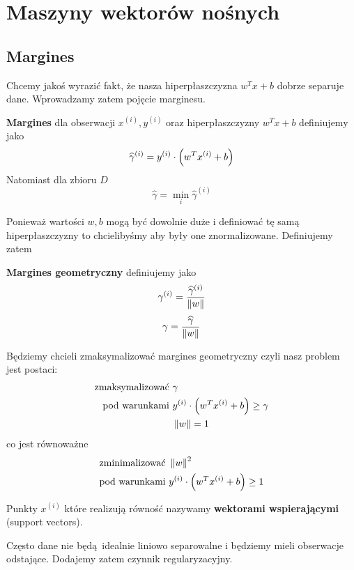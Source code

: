 \section{Maszyny wektorów nośnych}

\subsection{Margines}

Chcemy jakoś wyrazić fakt, że nasza hiperpłaszczyzna \( w^Tx + b \) dobrze separuje dane.
Wprowadzamy zatem pojęcie marginesu.

\begin{definition}
	\textbf{Margines} dla obserwacji \( x^{(i)}, y^{(i)} \) oraz hiperpłaszczyzny \( w^Tx + b\) definiujemy jako
	\[
		\widehat \gamma^{(i)} = y^{(i)} \cdot \left(w^T x^{(i)} + b\right)
	\]
	Natomiast dla zbioru \( D \)
	\[
		\widehat \gamma = \min_i \widehat \gamma^{(i)}
	\]
\end{definition}

Ponieważ wartości \( w, b \) mogą być dowolnie duże i definiować tę samą hiperpłaszczyzny to chcielibyśmy aby były one znormalizowane.
Definiujemy zatem
\begin{definition}
	\textbf{Margines geometryczny} definiujemy jako
	\[
		\gamma^{(i)} = \frac{\widehat \gamma^{(i)}}{\left\Vert w \right\Vert}
	\]
	\[
		\gamma = \frac{\widehat \gamma}{\left\Vert w \right\Vert}
	\]
\end{definition}

Będziemy chcieli zmaksymalizować margines geometryczny czyli nasz problem jest postaci:
\begin{align*}
	\text{zmaksymalizować } & \gamma                                           \\
	\text{pod warunkami }   & y^{(i)} \cdot \left(w^T x^{(i)} + b\right) \geq \gamma \\
	                        & \left\Vert w \right\Vert = 1
\end{align*}
co jest równoważne
\begin{align*}
	\text{zminimalizować } & \left\Vert w \right\Vert^2                                  \\
	\text{pod warunkami }  & y^{(i)} \cdot \left(w^T x^{(i)} + b\right) \geq 1 \\
\end{align*}

Punkty \( x^{(i)} \) które realizują równość nazywamy \textbf{wektorami wspierającymi} (support vectors).

Często dane nie będą idealnie liniowo separowalne i będziemy mieli obserwacje odstające.
Dodajemy zatem czynnik regularyzacyjny.

